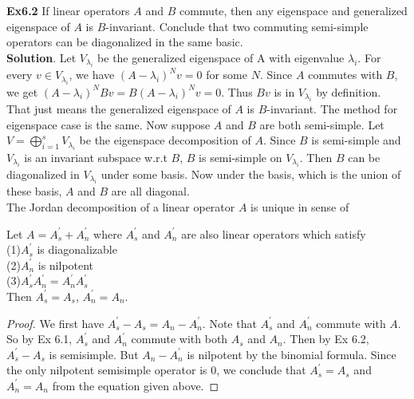 \documentclass[12pt,a4paper]{article}
\begin{document}
\noindent \textbf{Ex6.2} If linear operators $A$ and $B$ commute,
then any eigenspace and generalized eigenspace of $A$ is
$B$-invariant. Conclude that two commuting semi-simple operators
can be diagonalized in the same basic.\\
\textbf{Solution}. Let $V_{\lambda_{i}}$ be the generalized
eigenspace of A with eigenvalue $\lambda_{i}$. For every $v\in
V_{\lambda_{i}}$, we have $(A-\lambda_{i})^{N}v=0$ for some $N$.
Since $A$ commutes with $B$, we get
$(A-\lambda_{i})^{N}Bv=B(A-\lambda_{i})^{N}v=0$. Thus $Bv$ is in
$V_{\lambda_{i}}$ by definition. That just means the generalized
eigenspace of $A$ is $B$-invariant. The method for eigenspace case
is the same. Now suppose $A$ and $B$ are both semi-simple. Let
$V=\bigoplus_{i=1}^{s}V_{\lambda_{i}}$ be the eigenspace
decomposition of $A$. Since $B$ is semi-simple and
$V_{\lambda_{i}}$ is an invariant subspace w.r.t $B$, $B$ is
semi-simple on $V_{\lambda_{i}}$. Then $B$ can be diagonalized in
$V_{\lambda_{i}}$ under some basis. Now under the basis, which is
the union of these basis, $A$ and $B$ are all diagonal.
   \\

\noindent The Jordan decomposition of a linear operator $A$ is
unique in sense of \\
\begin{theorem} Let $A=A_{s}^{'}+A_{n}^{'}$ where
$A_{s}^{'}$ and
$A_{n}^{'}$ are also linear operators which satisfy\\
(1)$A_{s}^{'}$ is diagonalizable\\
(2)$A_{n}^{'}$ is nilpotent\\
(3)$A_{s}^{'}A_{n}^{'}=A_{n}^{'}A_{s}^{'}$ \\
Then $A_{s}^{'}=A_{s}$, $A_{n}^{'}=A_{n}$.
\end{theorem}
\begin{proof} We first have
$A_{s}^{'}-A_{s}=A_{n}-A_{n}^{'}$. Note that $A_{s}^{'}$ and
$A_{n}^{'}$ commute with $A$. So by Ex 6.1, $A_{s}^{'}$ and
$A_{n}^{'}$ commute with both $A_{s}$ and $A_{n}$. Then by Ex 6.2,
$A_{s}^{'}-A_{s}$ is semisimple. But $A_{n}-A_{n}^{'}$ is
nilpotent by the binomial formula. Since the only nilpotent
semisimple operator is $0$, we conclude that $A_{s}^{'}=A_{s}$ and
$A_{n}^{'}=A_{n}$ from the equation given above.
\end{proof}
\end{document}
